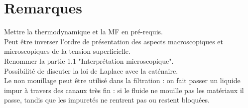 \documentclass[12pt,prb,aps,epsf]{report}
\begin{document}
\section*{Remarques}
Mettre la thermodynamique et la MF en pré-requis.\\
Peut être inverser l'ordre de présentation des aspects macroscopiques et microscopiques de la tension superficielle.\\
Renommer la partie 1.1 "Interprétation microscopique".\\
Possibilité de discuter la loi de Laplace avec la caténaire.\\
Le non mouillage peut être utilisé dans la filtration : on fait passer un liquide impur à travers des canaux très fin : si le fluide ne mouille pas les matériaux il passe, tandis que les impuretés ne rentrent pas ou restent bloquées.\\ 
\end{document}
